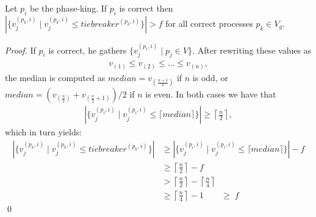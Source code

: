 \documentclass[runningheads]{llncs}
\begin{document}
\begin{lemma}\label{lemma:maxpk1}
    Let $p_i$ be the phase-king. If $p_i$ is correct then $|\{v_j^{(p_k,i)} \mid v_j^{(p_k,i)} \leq tiebreaker^{(p_k,i)}\}| > f$ for all correct processes $p_k \in V_g$.
\end{lemma}

\begin{proof}
    If $p_i$ is correct, he gathers $\{v_j^{(p_i,i)} \mid p_j \in V\}$. After rewriting these values as 
    \begin{align*}
        v_{(1)} \leq v_{(2)} \leq \ldots \leq v_{(n)},
    \end{align*}
    the median is computed as $median = v_{(\frac{n+1}{2})}$ if $n$ is odd, or $median = (v_{(\frac{n}{2})} + v_{(\frac{n}{2}+1)})/2$ if $n$ is even. In both cases we have that 
    \begin{align*}
        |\{v_j^{(p_i,i)} \mid v_j^{(p_i,i)} \leq \lceil median \rceil\}| \geq \left\lceil \frac{n}{2} \right\rceil,
    \end{align*} 
    which in turn yields:
    \begin{align*}
        |\{v_j^{(p_k,i)} \mid v_j^{(p_k,i)} \leq tiebreaker^{(p_k,i)}\}| &\geq |\{v_j^{(p_i,i)} \mid v_j^{(p_i,i)} \leq \lceil median \rceil\}| - f \\
        &\geq \left\lceil \frac{n}{2} \right\rceil - f \\
        &> \left\lceil \frac{n}{2} \right\rceil - \left\lceil \frac{n}{4} \right\rceil  \\
        &\geq \left\lceil \frac{n}{4} \right\rceil - 1 \qquad \geq \; f
    \end{align*} \qed
\end{proof}
\end{document}
